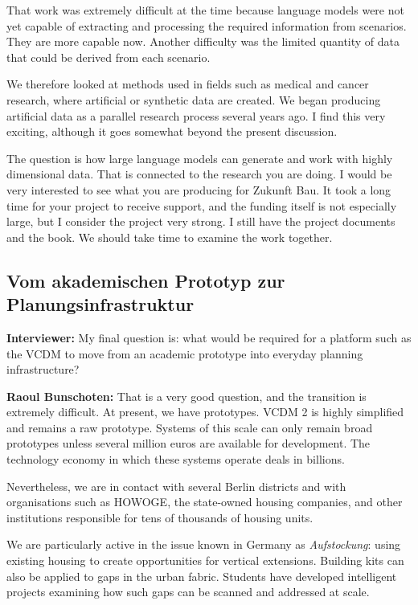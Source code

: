 That work was extremely difficult at the time because language models were not yet capable of extracting and processing the required information from scenarios. They are more capable now. Another difficulty was the limited quantity of data that could be derived from each scenario.

We therefore looked at methods used in fields such as medical and cancer research, where artificial or synthetic data are created. We began producing artificial data as a parallel research process several years ago. I find this very exciting, although it goes somewhat beyond the present discussion.

The question is how large language models can generate and work with highly dimensional data. That is connected to the research you are doing. I would be very interested to see what you are producing for Zukunft Bau. It took a long time for your project to receive support, and the funding itself is not especially large, but I consider the project very strong. I still have the project documents and the book. We should take time to examine the work together.

\subsection{Vom akademischen Prototyp zur Planungsinfrastruktur}

\textbf{Interviewer:} My final question is: what would be required for a platform such as the VCDM to move from an academic prototype into everyday planning infrastructure?

\textbf{Raoul Bunschoten:} That is a very good question, and the transition is extremely difficult. At present, we have prototypes. VCDM 2 is highly simplified and remains a raw prototype. Systems of this scale can only remain broad prototypes unless several million euros are available for development. The technology economy in which these systems operate deals in billions.

Nevertheless, we are in contact with several Berlin districts and with organisations such as HOWOGE, the state-owned housing companies, and other institutions responsible for tens of thousands of housing units.

We are particularly active in the issue known in Germany as \textit{Aufstockung}: using existing housing to create opportunities for vertical extensions. Building kits can also be applied to gaps in the urban fabric. Students have developed intelligent projects examining how such gaps can be scanned and addressed at scale.

